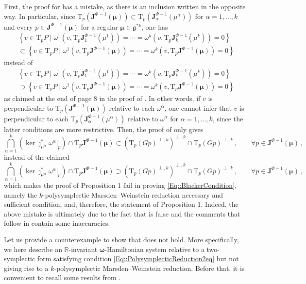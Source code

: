 \documentclass[11pt]{article}
\theoremstyle{plain}
\theoremstyle{definition}
\newcommand{\T}{\mathrm{T}}
\numberwithin{equation}{section}
\begin{document}
First, the proof for \cite[Proposition 1]{GM_23} has a mistake, as there is an inclusion written in the opposite way. In particular, since $\T_p(\mathbf{J}^{\Phi-1}(\bm\mu))\subset \T_p(\mathbf{J}_\alpha^{\Phi-1}(\mu^\alpha))$ for $\alpha=1,\ldots,k$ and every $p\in \mathbf{J}^{\Phi-1}(\bm\mu)$ for a regular $\bm\mu\in \mathfrak{g}^{*k}$, one has
\begin{multline*}
    \left\{v\in \T_pP\mid\omega^1(v,\T_p\mathbf{J}^{\Phi-1}_1(\mu^1))=\dotsb=\omega^k(v,\T_p\mathbf{J}^{\Phi-1}_k(\mu^k))=0\right\} \\
    \subset \left\{v\in \T_pP\mid\omega^1(v,\T_p\mathbf{J}^{\Phi-1}(\bm\mu))=\dotsb=\omega^k(v,\T_p\mathbf{J}^{\Phi-1}(\bm\mu)) = 0\right\}
\end{multline*}
instead of
\begin{multline*}
    \left\{v\in \T_pP\mid \omega^1(v,\T_p\mathbf{J}^{\Phi-1}_1(\mu^1))=\dotsb=\omega^k(v,\T_p\mathbf{J}^{\Phi-1}_k(\mu^k))=0\right\}\\
    \supset \left\{v\in \T_pP\mid \omega^1(v,\T_p\mathbf{J}^{\Phi-1}(\bm\mu))=\dotsb=\omega^k(v,\T_p\mathbf{J}^{\Phi-1}(\bm\mu)) = 0\right\}
\end{multline*}
as claimed at the end of page 8 in the proof of \cite[Proposition 1]{GM_23}. In other words, if $v$ is perpendicular to $\T_p(\mathbf{J}^{\Phi-1}(\bm\mu))$ relative to each $\omega^\alpha$, one cannot infer that $v$ is perpendicular to each $\T_p(\mathbf{J}^{\Phi-1}_\alpha(\mu^\alpha))$ relative to $\omega^\alpha$ for $\alpha=1,\dotsc,k$, since the latter conditions are more restrictive.
Then, the proof of \cite[Proposition 1]{GM_23} only gives
$$
    \bigcap_{\alpha=1}^k(\ker \jmath^*_{\mu^\alpha}\omega^\alpha|_p)\cap \T_p{\mathbf{J}^{\Phi-1}(\bm\mu)}\subset (\T_{p}(Gp)^{\perp,k})^{\perp,k}\cap \T_{p}(Gp)^{\perp,k}\,,\qquad \forall p\in \mathbf{J}^{\Phi-1}(\bm\mu)\,,
$$
instead of the claimed
$$
\bigcap_{\alpha=1}^k(\ker \jmath^*_{\mu^\alpha}\omega^\alpha|_p)\cap \T_p{\mathbf{J}^{\Phi-1}(\bm\mu)}\supset (\T_{p}(Gp)^{\perp,k})^{\perp,k}\cap \T_{p}(Gp)^{\perp,k}\,,\qquad \forall p\in \mathbf{J}^{\Phi-1}(\bm\mu)\,,
$$
which makes the proof of Proposition 1 fail in proving \eqref{Eq::BlackerCondition}, namely the $k$-polysymplectic Marsden--Weinstein reduction necessary and sufficient condition, and, therefore, the statement of Proposition 1. Indeed, the above mistake is ultimately due to the fact that \cite[Proposition 1]{GM_23} is false and the comments that follow in \cite{GM_23} contain some inaccuracies. 


Let us provide a counterexample to show that \cite[Proposition 1]{GM_23} does not hold. More specifically, we here describe an $\mathbb{R}$-invariant $\boldsymbol{\omega}$-Hamiltonian system relative to a two-symplectic form satisfying condition \eqref{Eq::PolysymplecticReduction2eq} but not giving rise to a $k$-polysymplectic Marsden--Weinstein reduction. Before that, it is convenient to recall some results from 
\cite{MRSV_15}.
\end{document}
